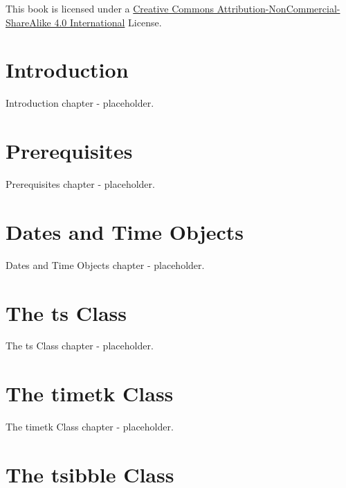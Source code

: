 \documentclass[
  letterpaper,
  DIV=11,
  numbers=noendperiod]{scrreprt}
\begin{document}
This book is licensed under a
\href{https://creativecommons.org/licenses/by-nc-sa/4.0/}{Creative
Commons Attribution-NonCommercial-ShareAlike 4.0 International} License.


\hypertarget{introduction}{%
\chapter{Introduction}\label{introduction}}

Introduction chapter - placeholder.


\hypertarget{prerequisites}{%
\chapter{Prerequisites}\label{prerequisites}}

Prerequisites chapter - placeholder.


\hypertarget{dates-and-time-objects}{%
\chapter{Dates and Time Objects}\label{dates-and-time-objects}}

Dates and Time Objects chapter - placeholder.


\hypertarget{the-ts-class}{%
\chapter{The ts Class}\label{the-ts-class}}

The ts Class chapter - placeholder.


\hypertarget{the-timetk-class}{%
\chapter{The timetk Class}\label{the-timetk-class}}

The timetk Class chapter - placeholder.


\hypertarget{the-tsibble-class}{%
\chapter{The tsibble Class}\label{the-tsibble-class}}
\end{document}
